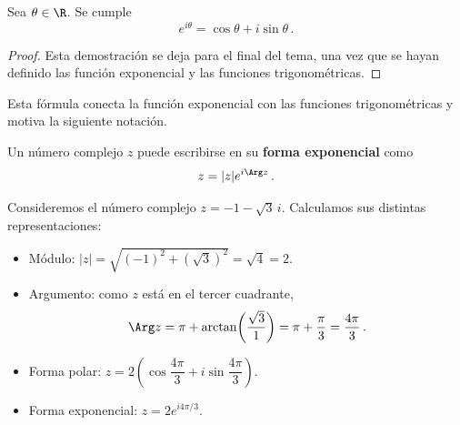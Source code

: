 \begin{theo}
  Sea $\theta\in\R$. Se cumple
  \begin{equation}
    \label{eq:formula-euler}
    e^{i\theta} = \cos\theta + i\sin\theta\,.
  \end{equation}
\end{theo}
\begin{proof}
  Esta demostración se deja para el final del tema, una vez que se hayan definido las función exponencial y las funciones trigonométricas.
\end{proof}

Esta fórmula conecta la función exponencial con las funciones trigonométricas y motiva la siguiente notación.

\begin{defi}
  \label{def:forma-exponencial}
  Un número complejo $z$ puede escribirse en su \textbf{forma exponencial} como
  \[ z = |z|e^{i\Arg z}\,. \]
\end{defi}

\begin{eje}
  Consideremos el número complejo $z=-1-\sqrt{3}\,i$. Calculamos sus distintas representaciones:
  \begin{itemize}
    \item Módulo: $|z|=\sqrt{(-1)^2+(\sqrt{3})^2}=\sqrt{4}=2$.
    \item Argumento: como $z$ está en el tercer cuadrante,
          \[
            \Arg z = \pi + \arctan\!\left(\frac{\sqrt{3}}{1}\right) = \pi + \frac{\pi}{3} = \frac{4\pi}{3}\,.
          \]
    \item Forma polar: $z=2\left(\cos\dfrac{4\pi}{3} + i\sin\dfrac{4\pi}{3}\right)$.
    \item Forma exponencial: $z=2e^{i4\pi/3}$.
  \end{itemize}
\end{eje}

